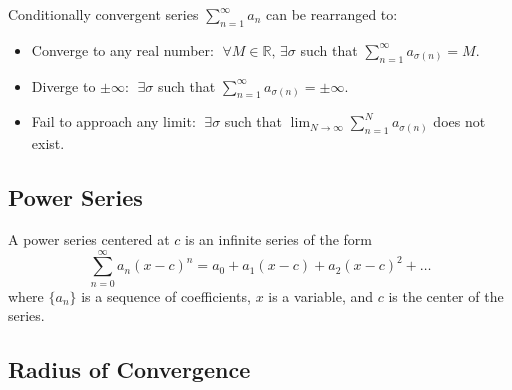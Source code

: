 \documentclass[a4paper,11pt]{article}
\begin{document}
\begin{tcolorbox}
    Conditionally convergent series $\textstyle \sum_{n=1}^{\infty} a_n$ can be rearranged to:
    \begin{itemize}
        \item Converge to any real number: $\; \textstyle \forall M \in \mathbb{R}, \, \exists \sigma$ such that $\sum_{n=1}^{\infty} a_{\sigma (n)} = M$.
        \item Diverge to $\pm \infty$: $\;  \textstyle \exists \sigma$ such that $\sum_{n=1}^{\infty} a_{\sigma (n)} = \pm \infty$.
        \item Fail to approach any limit: $\;  \exists \sigma$ such that $\lim_{N \to \infty} \sum_{n=1}^N a_{\sigma (n)}$ does not exist.
    \end{itemize}
\end{tcolorbox}




\subsection{Power Series}

\begin{tcolorbox}
    A power series centered at $c$ is an infinite series of the form
    \[
    \sum_{n=0}^{\infty} a_n (x-c)^n = a_0 + a_1 (x - c) + a_2 (x - c)^2 + \dots
    \]
    where $\{a_n\}$ is a sequence of coefficients, $x$ is a variable, and $c$ is the center of the series.
\end{tcolorbox}




\subsection{Radius of Convergence}
\end{document}
